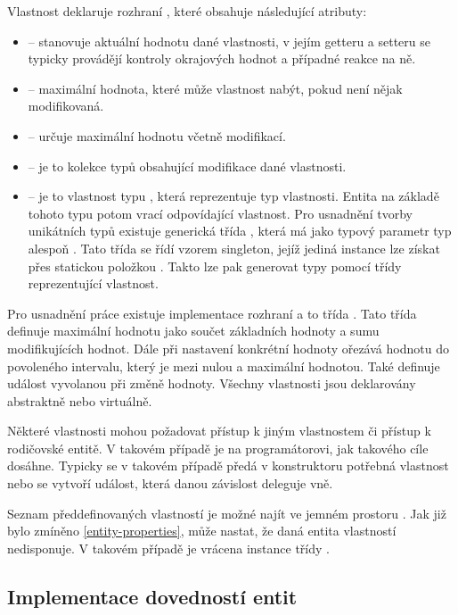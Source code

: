 Vlastnost deklaruje rozhraní , které obsahuje následující atributy:
\begin{itemize}
\item {} -- stanovuje aktuální hodnotu dané vlastnosti, v jejím getteru a setteru se typicky provádějí 
	kontroly okrajových hodnot a případné reakce na ně.
\item {} -- maximální hodnota, které může vlastnost nabýt, pokud není nějak modifikovaná.
\item {} -- určuje maximální hodnotu včetně modifikací. 
\item {} -- je to kolekce typů  obsahující modifikace dané vlastnosti.
\item {} -- je to vlastnost typu , která reprezentuje typ vlastnosti. Entita na základě 
	tohoto typu potom vrací odpovídající vlastnost. Pro usnadnění tvorby unikátních typů existuje generická třída , 
	která má jako typový parametr typ alespoň . Tato třída se řídí vzorem singleton, jejíž jediná instance 
	lze získat přes statickou položkou . Takto lze pak generovat typy pomocí třídy reprezentující vlastnost.
\end{itemize}

Pro usnadnění práce existuje implementace rozhraní  a to třída . Tato třída definuje 
maximální hodnotu jako součet základních hodnoty a sumu modifikujících hodnot. Dále při nastavení konkrétní hodnoty ořezává
hodnotu do povoleného intervalu, který je mezi nulou a maximální hodnotou. Také definuje událost vyvolanou při změně hodnoty.
Všechny vlastnosti jsou deklarovány abstraktně nebo virtuálně. 

Některé vlastnosti mohou požadovat přístup k jiným vlastnostem či přístup k rodičovské entitě. V takovém
případě je na programátorovi, jak takového cíle dosáhne. Typicky se v takovém případě předá v konstruktoru
potřebná vlastnost nebo se vytvoří událost, která danou závislost deleguje vně. 

Seznam předdefinovaných vlastností je možné najít ve jemném prostoru .
Jak již bylo zmíněno \vref{entity-properties}, může nastat, že daná entita vlastností nedisponuje. V takovém případě 
je vrácena instance třídy . 

\subsection{Implementace dovedností entit}

